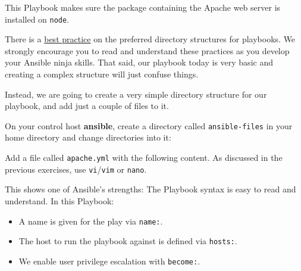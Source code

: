 This Playbook makes sure the package containing the Apache web server is
installed on \texttt{node}.

There is a
\href{https://docs.ansible.com/ansible/latest/user_guide/playbooks_best_practices.html}{best
practice} on the preferred directory structures for playbooks. We
strongly encourage you to read and understand these practices as you
develop your Ansible ninja skills. That said, our playbook today is very
basic and creating a complex structure will just confuse things.

Instead, we are going to create a very simple directory structure for
our playbook, and add just a couple of files to it.

On your control host \textbf{ansible}, create a directory called
\texttt{ansible-files} in your home directory and change directories
into it:

\begin{Shaded}
\begin{Highlighting}[]
\ExtensionTok{[student@controller}\NormalTok{ \textasciitilde{}]$ mkdir ansible{-}files}
\ExtensionTok{[student@controller}\NormalTok{ \textasciitilde{}]$ cd ansible{-}files/}
\end{Highlighting}
\end{Shaded}

Add a file called \texttt{apache.yml} with the following content. As
discussed in the previous exercises, use \texttt{vi}/\texttt{vim} or \texttt{nano}.

\begin{Shaded}
\begin{Highlighting}[]
\PreprocessorTok{{-}{-}{-}}
\KeywordTok{{-}}\AttributeTok{ }\KeywordTok{:}
\AttributeTok{  }\KeywordTok{:}
\AttributeTok{  }\KeywordTok{:}\AttributeTok{ }
\end{Highlighting}
\end{Shaded}

This shows one of Ansible's strengths: The Playbook syntax is easy to
read and understand. In this Playbook:

\begin{itemize}
\tightlist
\item
  A name is given for the play via \texttt{name:}.
\item
  The host to run the playbook against is defined via \texttt{hosts:}.
\item
  We enable user privilege escalation with \texttt{become:}.
\end{itemize}

